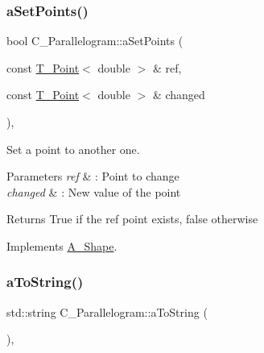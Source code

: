 \subsubsection{\texorpdfstring{a\+Set\+Points()}{aSetPoints()}\hspace{0.1cm}{\footnotesize\ttfamily [2/2]}}
{\footnotesize\ttfamily bool C\+\_\+\+Parallelogram\+::a\+Set\+Points (\begin{DoxyParamCaption}\item[{const \hyperlink{classT__Point}{T\+\_\+\+Point}$<$ double $>$ \&}]{ref,  }\item[{const \hyperlink{classT__Point}{T\+\_\+\+Point}$<$ double $>$ \&}]{changed }\end{DoxyParamCaption})\hspace{0.3cm}{\ttfamily [override]}, {\ttfamily [virtual]}}



Set a point to another one. 


\begin{DoxyParams}{Parameters}
{\em ref} & \+: Point to change \\
\hline
{\em changed} & \+: New value of the point \\
\hline
\end{DoxyParams}
\begin{DoxyReturn}{Returns}
True if the ref point exists, false otherwise 
\end{DoxyReturn}


Implements \hyperlink{classA__Shape_a6996f454b337f8425ad13cba3f7a7c35}{A\+\_\+\+Shape}.

\mbox{\label{classC__Parallelogram_add67ef2aba5e14c27e30a958e4843223}} 
\subsubsection{\texorpdfstring{a\+To\+String()}{aToString()}\hspace{0.1cm}{\footnotesize\ttfamily [1/2]}}
{\footnotesize\ttfamily std\+::string C\+\_\+\+Parallelogram\+::a\+To\+String (\begin{DoxyParamCaption}{ }\end{DoxyParamCaption})\hspace{0.3cm}{\ttfamily [override]}, {\ttfamily [virtual]}}



